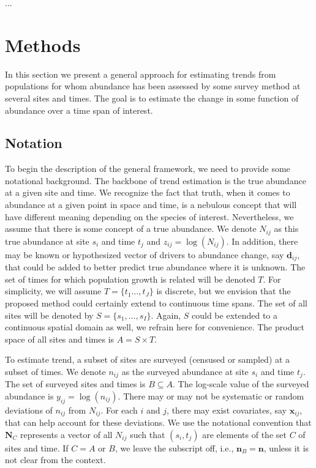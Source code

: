\documentclass[12pt,letter]{article}
\newcommand{\Nij}{\ensuremath{N_{ij}}}
\newcommand{\nij}{\ensuremath{n_{ij}}}
\newcommand{\zij}{\ensuremath{z_{ij}}}
\newcommand{\yij}{\ensuremath{y_{ij}}}
\newcommand{\bx}{\ensuremath{\mathbf{x}}}
\begin{document}
...
   
\section{Methods}

In this section we present a general approach for estimating trends from populations for whom abundance has been assessed by some survey method at several sites and times. The goal is to estimate the change in some function of abundance over a time span of interest. 

\subsection{Notation}

To begin the description of the general framework, we need to provide some notational background. The backbone of trend estimation is the true abundance at a given site and time. We recognize the fact that truth, when it comes to abundance at a given point in space and time, is a nebulous concept that will have different meaning depending on the species of interest. Nevertheless, we assume that there is some concept of a true abundance. We denote $\Nij$ as this true abundance at site $s_i$ and time $t_j$ and $\zij=\log(\Nij)$. In addition, there may be known or hypothesized vector of drivers to abundance change, say $\mathbf{d}_{ij}$, that could be added to better predict true abundance where it is unknown. The set of times for which population growth is related will be denoted $T$. For simplicity, we will assume $T = \{t_1\dots,t_J\}$ is discrete, but we envision that the proposed method could certainly extend to continuous time spans.  The set of all sites will be denoted by $S = \{s_1,\dots,s_I\} $. Again, $S$ could be extended to a continuous spatial domain as well, we refrain here for convenience. The product space of all sites and times is $A = S \times T$.

To estimate trend, a subset of sites are surveyed (censused or sampled) at a subset of times. We denote $\nij$ as the surveyed abundance at site $s_i$ and time $t_j$. The set of surveyed sites and times is $B\subseteq A$. The log-scale value of the surveyed abundance is $\yij=\log(\nij)$. There may or may not be systematic or random deviations of $\nij$ from $\Nij$. For each $i$ and $j$, there may exist covariates, say $\bx_{ij}$, that can help account for these deviations. We use the notational convention that $\mathbf{N}_C$ represents a vector of all $\Nij$ such that $(s_i, t_j)$ are elements of the set $C$ of sites and time. If $C=A$ or $B$, we leave the subscript off, i.e., $\mathbf{n}_B = \mathbf{n}$, unless it is not clear from the context.
\end{document}

